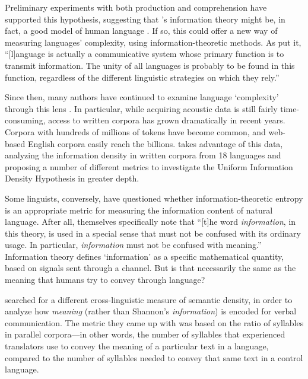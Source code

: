 \documentclass[12pt,twoside,leqno]{article} %
\begin{document}
Preliminary experiments with both production and comprehension have supported this hypothesis, suggesting that \citeauthor{shannon}'s information theory might be, in fact, a good model of human language \parencites[29]{jaeger}[970-971]{meister}. If so, this could offer a new way of measuring languages' complexity, using information-theoretic methods. As \citet[539]{pellegrino} put it, ``[l]anguage is actually a communicative system whose primary function is to transmit information. The unity of all languages is probably to be found in this function, regardless of the different linguistic strategies on which they rely.''

Since then, many authors have continued to examine language `complexity' through this lens \citep{pellegrino,oh,coupé}. In particular, while acquiring acoustic data is still fairly time-consuming, access to written corpora has grown dramatically in recent years. Corpora with hundreds of millions of tokens have become common, and web-based English corpora easily reach the billions. \citet{oh} takes advantage of this data, analyzing the information density in written corpora from 18 languages and proposing a number of different metrics to investigate the Uniform Information Density Hypothesis in greater depth.

Some linguists, conversely, have questioned whether information-theoretic entropy is an appropriate metric for measuring the information content of natural language. After all, \citet[8]{shannon} themselves specifically note that ``[t]he word \emph{information}, in this theory, is used in a special sense that must not be confused with its ordinary usage. In particular, \emph{information} must not be confused with meaning.'' Information theory defines `information' as a specific mathematical quantity, based on signals sent through a channel. But is that necessarily the same as the meaning that humans try to convey through language?

\citet{pellegrino} searched for a different cross-linguistic measure of semantic density, in order to analyze how \emph{meaning} (rather than Shannon's \emph{information}) is encoded for verbal communication. The metric they came up with was based on the ratio of syllables in parallel corpora---in other words, the number of syllables that experienced translators use to convey the meaning of a particular text in a language, compared to the number of syllables needed to convey that same text in a control language.

\end{document}
